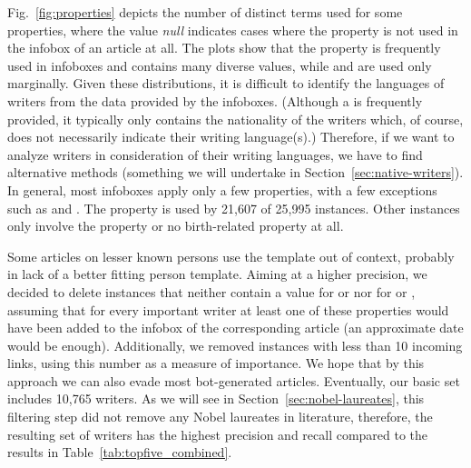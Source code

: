 \documentclass[a4paper,12pt]{scrartcl}
\begin{document}
%
Fig.~\ref{fig:properties} depicts the number of distinct terms used
for some properties, where the value \emph{null} indicates cases where
the property is not used in the infobox of an article at all.
%
The plots show that the  property is frequently
used in  infoboxes and contains many diverse values,
while  and  are used only
marginally.
%
Given these distributions, it is difficult to identify the languages
of writers from the data provided by the infoboxes. %
(Although
  a  is frequently provided, it typically only
  contains the nationality of the writers which, of course, does not
  necessarily indicate their writing language(s).) %
%
Therefore, if we want to analyze writers in consideration of their
writing languages, we have to find alternative methods (something we
will undertake in Section~\ref{sec:native-writers}).
%
%
In general, most infoboxes apply only a few properties, with
a few exceptions such as  and .
%
The  property is used by 21,607 of 25,995
instances. Other instances only involve the  property
or no birth-related property at all.

Some articles on lesser known persons use the  template out
of context, probably in lack of a better fitting person template.
Aiming at a higher precision, we
decided to delete instances that neither contain a value for
 or  nor for  or
, assuming that for every important writer at least
one of these properties would have been added to the infobox of the
corresponding article (an approximate date would be enough).
%
%
Additionally, we removed instances with less than 10 incoming links,
using this number as a measure of importance. We hope that by this
approach we can also evade most bot-generated articles.
%
Eventually, our basic set includes 10,765 writers.
%
As we will see in Section~\ref{sec:nobel-laureates}, this filtering
step did not remove any Nobel laureates in literature, therefore, the
resulting set of writers has the highest precision %
and recall %
compared to the results in Table~\ref{tab:topfive_combined}.
%
\end{document}
